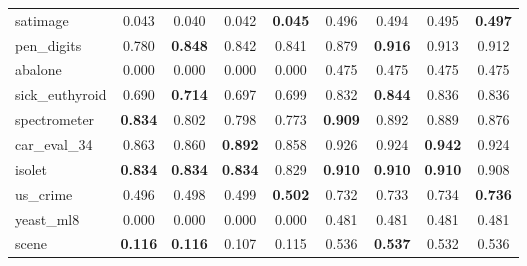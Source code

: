 \begin{figure}[ht]
\begin{tabular}{p{22mm}|*4{p{14mm}}|*4{p{14mm}}}
        satimage&\multicolumn{1}{c}{0.043}&\multicolumn{1}{c}{0.040}&\multicolumn{1}{c}{0.042}&\multicolumn{1}{c|}{\textbf{0.045}}&\multicolumn{1}{c}{0.496}&\multicolumn{1}{c}{0.494}&\multicolumn{1}{c}{0.495}&\multicolumn{1}{c}{\textbf{0.497}}\\
        pen\_digits&\multicolumn{1}{c}{0.780}&\multicolumn{1}{c}{\textbf{0.848}}&\multicolumn{1}{c}{0.842}&\multicolumn{1}{c|}{0.841}&\multicolumn{1}{c}{0.879}&\multicolumn{1}{c}{\textbf{0.916}}&\multicolumn{1}{c}{0.913}&\multicolumn{1}{c}{0.912}\\
        abalone&\multicolumn{1}{c}{0.000}&\multicolumn{1}{c}{0.000}&\multicolumn{1}{c}{0.000}&\multicolumn{1}{c|}{0.000}&\multicolumn{1}{c}{0.475}&\multicolumn{1}{c}{0.475}&\multicolumn{1}{c}{0.475}&\multicolumn{1}{c}{0.475}\\
        sick\_euthyroid&\multicolumn{1}{c}{0.690}&\multicolumn{1}{c}{\textbf{0.714}}&\multicolumn{1}{c}{0.697}&\multicolumn{1}{c|}{0.699}&\multicolumn{1}{c}{0.832}&\multicolumn{1}{c}{\textbf{0.844}}&\multicolumn{1}{c}{0.836}&\multicolumn{1}{c}{0.836}\\
        spectrometer&\multicolumn{1}{c}{\textbf{0.834}}&\multicolumn{1}{c}{0.802}&\multicolumn{1}{c}{0.798}&\multicolumn{1}{c|}{0.773}&\multicolumn{1}{c}{\textbf{0.909}}&\multicolumn{1}{c}{0.892}&\multicolumn{1}{c}{0.889}&\multicolumn{1}{c}{0.876}\\
        car\_eval\_34&\multicolumn{1}{c}{0.863}&\multicolumn{1}{c}{0.860}&\multicolumn{1}{c}{\textbf{0.892}}&\multicolumn{1}{c|}{0.858}&\multicolumn{1}{c}{0.926}&\multicolumn{1}{c}{0.924}&\multicolumn{1}{c}{\textbf{0.942}}&\multicolumn{1}{c}{0.924}\\
        isolet&\multicolumn{1}{c}{\textbf{0.834}}&\multicolumn{1}{c}{\textbf{0.834}}&\multicolumn{1}{c}{\textbf{0.834}}&\multicolumn{1}{c|}{0.829}&\multicolumn{1}{c}{\textbf{0.910}}&\multicolumn{1}{c}{\textbf{0.910}}&\multicolumn{1}{c}{\textbf{0.910}}&\multicolumn{1}{c}{0.908}\\
        us\_crime&\multicolumn{1}{c}{0.496}&\multicolumn{1}{c}{0.498}&\multicolumn{1}{c}{0.499}&\multicolumn{1}{c|}{\textbf{0.502}}&\multicolumn{1}{c}{0.732}&\multicolumn{1}{c}{0.733}&\multicolumn{1}{c}{0.734}&\multicolumn{1}{c}{\textbf{0.736}}\\
        yeast\_ml8&\multicolumn{1}{c}{0.000}&\multicolumn{1}{c}{0.000}&\multicolumn{1}{c}{0.000}&\multicolumn{1}{c|}{0.000}&\multicolumn{1}{c}{0.481}&\multicolumn{1}{c}{0.481}&\multicolumn{1}{c}{0.481}&\multicolumn{1}{c}{0.481}\\
        scene&\multicolumn{1}{c}{\textbf{0.116}}&\multicolumn{1}{c}{\textbf{0.116}}&\multicolumn{1}{c}{0.107}&\multicolumn{1}{c|}{0.115}&\multicolumn{1}{c}{0.536}&\multicolumn{1}{c}{\textbf{0.537}}&\multicolumn{1}{c}{0.532}&\multicolumn{1}{c}{0.536}\\

\end{tabular}
\end{figure}
